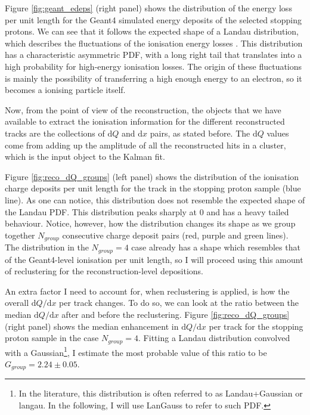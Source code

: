Figure \ref{fig:geant_edeps} (right panel) shows the distribution of the energy loss per unit length for the Geant4 simulated energy deposits of the selected stopping protons. We can see that it follows the expected shape of a Landau distribution, which describes the fluctuations of the ionisation energy losses \cite{Landau1944}. This distribution has a characteristic asymmetric PDF, with a long right tail that translates into a high probability for high-energy ionisation losses. The origin of these fluctuations is mainly the possibility of transferring a high enough energy to an electron, so it becomes a ionising particle itself.

Now, from the point of view of the reconstruction, the objects that we have available to extract the ionisation information for the different reconstructed tracks are the collections of $\mathrm{d}Q$ and $\mathrm{d}x$ pairs, as stated before. The $\mathrm{d}Q$ values come from adding up the amplitude of all the reconstructed hits in a cluster, which is the input object to the Kalman fit.

Figure \ref{fig:reco_dQ_groups} (left panel) shows the distribution of the ionisation charge deposits per unit length for the track in the stopping proton sample (blue line). As one can notice, this distribution does not resemble the expected shape of the Landau PDF. This distribution peaks sharply at $0$ and has a heavy tailed behaviour. Notice, however, how the distribution changes its shape as we group together $N_{group}$ consecutive charge deposit pairs (red, purple and green lines). The distribution in the $N_{group} = 4$ case already has a shape which resembles that of the Geant4-level ionisation per unit length, so I will proceed using this amount of reclustering for the reconstruction-level depositions.

An extra factor I need to account for, when reclustering is applied, is how the overall $\mathrm{d}Q/\mathrm{d}x$ per track changes. To do so, we can look at the ratio between the median $\mathrm{d}Q/\mathrm{d}x$ after and before the reclustering. Figure \ref{fig:reco_dQ_groups} (right panel) shows the median enhancement in $\mathrm{d}Q/\mathrm{d}x$ per track for the stopping proton sample in the case $N_{group}=4$. Fitting a Landau distribution convolved with a Gaussian\footnote{In the literature, this distribution is often referred to as Landau+Gaussian or langau. In the following, I will use LanGauss to refer to such PDF.}, I estimate the most probable value of this ratio to be $G_{group} = 2.24 \pm 0.05$.

